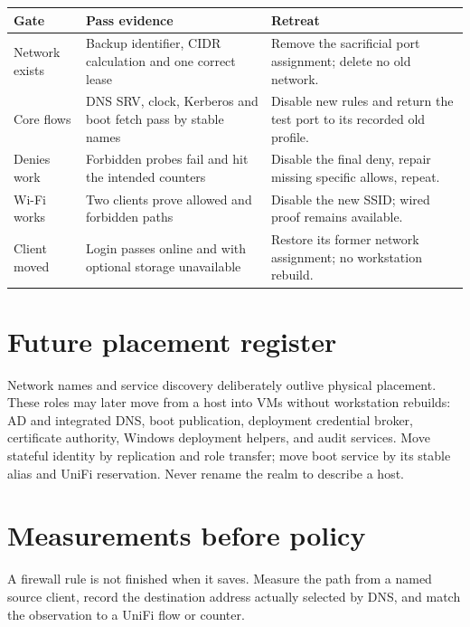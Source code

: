 \begin{tabularx}{\linewidth}{@{}p{.16\linewidth}p{.25\linewidth}L@{}}
\toprule
\textbf{Gate} & \textbf{Pass evidence} & \textbf{Retreat}\\
\midrule
Network exists & Backup identifier, CIDR calculation and one correct lease & Remove the sacrificial port assignment; delete no old network.\\
Core flows & DNS SRV, clock, Kerberos and boot fetch pass by stable names & Disable new rules and return the test port to its recorded old profile.\\
Denies work & Forbidden probes fail and hit the intended counters & Disable the final deny, repair missing specific allows, repeat.\\
Wi-Fi works & Two clients prove allowed and forbidden paths & Disable the new SSID; wired proof remains available.\\
Client moved & Login passes online and with optional storage unavailable & Restore its former network assignment; no workstation rebuild.\\
\bottomrule
\end{tabularx}

\section{Future placement register}
Network names and service discovery deliberately outlive physical placement.
These roles may later move from a host into VMs without workstation rebuilds:
AD and integrated DNS, boot publication, deployment credential broker,
certificate authority, Windows deployment helpers, and audit services.  Move
stateful identity by replication and role transfer; move boot service by its
stable alias and UniFi reservation.  Never rename the realm to describe a host.

\section{Measurements before policy}
A firewall rule is not finished when it saves.  Measure the path from a named
source client, record the destination address actually selected by DNS, and
match the observation to a UniFi flow or counter.


